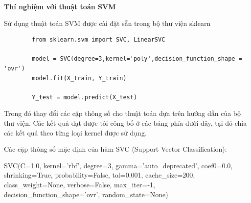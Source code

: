 \documentclass[12pt]{report}
\begin{document}
		\textbf{Thí nghiệm với thuật toán SVM}
						
		Sử dụng thuật toán SVM được cài đặt sẵn trong bộ thư viện sklearn
		\begin{lstlisting}
		from sklearn.svm import SVC, LinearSVC

		model = SVC(degree=3,kernel='poly',decision_function_shape = 'ovr')
		model.fit(X_train, Y_train)

		Y_test = model.predict(X_test)
		\end{lstlisting}
				
		Trong đó thay đổi các cặp thông số cho thuật toán dựa trên hướng dẫn của bộ thư viện. Các kết quả đạt được tôi công bố ở các bảng phía dưới đây, tại đó chia các kết quả theo từng loại kernel được sử dụng.
						
		Các cặp thông số mặc định của hàm SVC (Support Vector Classification): 
				
		SVC(C=1.0, kernel='rbf', degree=3, gamma='auto\_deprecated', coef0=0.0, shrinking=True, probability=False, tol=0.001, cache\_size=200, class\_weight=None, verbose=False, max\_iter=-1, decision\_function\_shape=’ovr’, random\_state=None)
		
\end{document}
